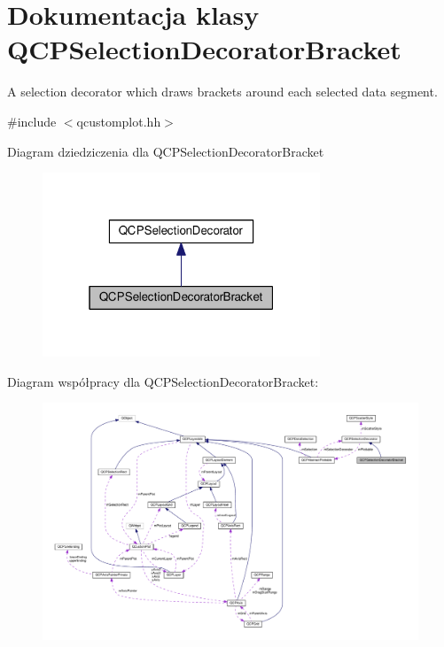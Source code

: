\hypertarget{class_q_c_p_selection_decorator_bracket}{}\section{Dokumentacja klasy Q\+C\+P\+Selection\+Decorator\+Bracket}
\label{class_q_c_p_selection_decorator_bracket}


A selection decorator which draws brackets around each selected data segment.  




{\ttfamily \#include $<$qcustomplot.\+hh$>$}



Diagram dziedziczenia dla Q\+C\+P\+Selection\+Decorator\+Bracket\nopagebreak
\begin{figure}[H]
\begin{center}
\leavevmode
\includegraphics[width=235pt]{class_q_c_p_selection_decorator_bracket__inherit__graph}
\end{center}
\end{figure}


Diagram współpracy dla Q\+C\+P\+Selection\+Decorator\+Bracket\+:\nopagebreak
\begin{figure}[H]
\begin{center}
\leavevmode
\includegraphics[width=350pt]{class_q_c_p_selection_decorator_bracket__coll__graph}
\end{center}
\end{figure}
